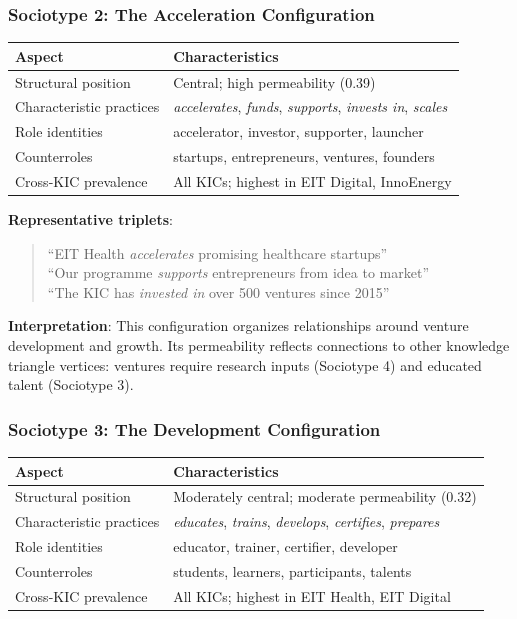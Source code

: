 \documentclass[../main.tex]{subfiles}
\begin{document}
\subsubsection{Sociotype 2: The Acceleration Configuration}

\begin{center}
\small
\begin{tabular}{ll}
\toprule
\textbf{Aspect} & \textbf{Characteristics} \\
\midrule
Structural position & Central; high permeability (0.39) \\
Characteristic practices & \textit{accelerates}, \textit{funds}, \textit{supports}, \textit{invests in}, \textit{scales} \\
Role identities & accelerator, investor, supporter, launcher \\
Counterroles & startups, entrepreneurs, ventures, founders \\
Cross-KIC prevalence & All KICs; highest in EIT Digital, InnoEnergy \\
\bottomrule
\end{tabular}
\end{center}

\textbf{Representative triplets}:
\begin{quote}
\small
``EIT Health \textit{accelerates} promising healthcare startups''\\
``Our programme \textit{supports} entrepreneurs from idea to market''\\
``The KIC has \textit{invested in} over 500 ventures since 2015''
\end{quote}

\textbf{Interpretation}: This configuration organizes relationships around venture development and growth. Its permeability reflects connections to other knowledge triangle vertices: ventures require research inputs (Sociotype 4) and educated talent (Sociotype 3).

\subsubsection{Sociotype 3: The Development Configuration}

\begin{center}
\small
\begin{tabular}{ll}
\toprule
\textbf{Aspect} & \textbf{Characteristics} \\
\midrule
Structural position & Moderately central; moderate permeability (0.32) \\
Characteristic practices & \textit{educates}, \textit{trains}, \textit{develops}, \textit{certifies}, \textit{prepares} \\
Role identities & educator, trainer, certifier, developer \\
Counterroles & students, learners, participants, talents \\
Cross-KIC prevalence & All KICs; highest in EIT Health, EIT Digital \\
\bottomrule
\end{tabular}
\end{center}
\end{document}
